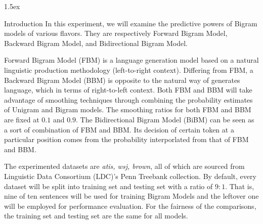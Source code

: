 \documentclass[11pt,a4paper]{article}
\begin{document}
\begin{titlepage}
    \maketitle
\end{titlepage}

\parindent 0in
\parskip 1.5ex

\begin{section}{Introduction}
    In this experiment, we will examine the predictive powers of Bigram
    models of various flavors. They are respectively Forward Bigram Model,
    Backward Bigram Model, and Bidirectional Bigram Model. 

    Forward Bigram Model (FBM) is a language generation model based on a natural
    linguistic production methodology (left-to-right context). 
    Differing from FBM, a Backward Bigram Model (BBM) is opposite to the
    natural way of generates language, which in terms of right-to-left
    context. Both FBM and BBM will take advantage of smoothing techniques
    through combining the probability estimates of Unigram and Bigram models. 
    The smoothing ratios for both FBM and BBM are fixed at $0.1$ and $0.9$.
    The Bidirectional Bigram Model (BiBM) can be seen as a sort of combination
    of FBM and BBM. Its decision of certain token at a particular position
    comes from the probability interporlated from that of FBM and BBM.
    
    The experimented datasets are \textit{atis, wsj, brown}, all of which are
    sourced from Linguistic Data Consortium (LDC)'s Penn Treebank collection. 
    By default, every dataset will be split into training set and testing set
    with a ratio of $9:1$. That is, nine of ten sentences will be used for
    training Bigram Models and the leftover one will be employed for
    performance evaluation. For the fairness of the comparisons, the training
    set and testing set are the same for all models. 

\end{section}
\end{document}
